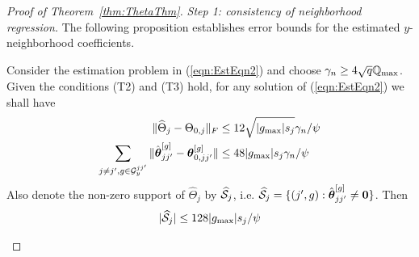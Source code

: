 \documentclass[12pt, letterpaper]{article}
\numberwithin{equation}{section}
\begin{document}
\begin{proof}[Proof of Theorem~\ref{thm:ThetaThm}]
%


{\it Step 1: consistency of neighborhood regression.} The following proposition establishes error bounds for the estimated $y$-neighborhood coefficients.

\begin{Proposition}\label{prop:Thm1ProofProp2}
Consider the estimation problem in (\ref{eqn:EstEqn2}) and choose $\gamma_n \geq 4 \sqrt q {\mathbb{Q}}_{\max}$. Given the conditions (T2) and (T3) hold, for any solution of (\ref{eqn:EstEqn2}) we shall have
%
\begin{align}
\| \widehat \Theta_j - \Theta_{0,j} \|_F & \leq 12 \sqrt{|g_{\max}| s_j} \gamma_n / \psi \label{eqn:Thm1ProofProp2Bd1}\\
\sum_{j \neq j', g \in {\cal{G}}_y^{jj'}} \| \hat {{\boldsymbol{\theta}}}_{jj'}^{[g]} - {\boldsymbol{\theta}}_{0,jj'}^{[g]} \| & \leq 48 | g_{\max}| s_j \gamma_n / \psi \label{eqn:Thm1ProofProp2Bd2}
\end{align}
%
Also denote the non-zero support of $\widehat \Theta_j$ by $\widehat {{\cal{S}}}_j$, i.e. $\widehat {{\cal{S}}}_j = \{ (j',g): \hat {{\boldsymbol{\theta}}}_{jj'}^{[g]} \neq {\bf 0} \}$. Then
%
\begin{align}
| \widehat {{\cal{S}}}_j| \leq 128 | g_{\max}| s_j / \psi \label{eqn:Thm1ProofProp2Bd3}
\end{align}
\end{Proposition}


\end{proof}
\end{document}
